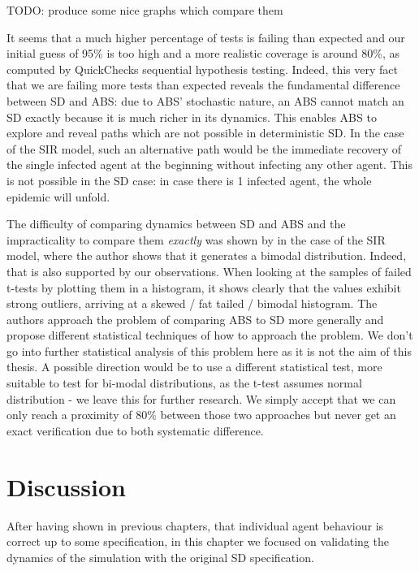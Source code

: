 TODO: produce some nice graphs which compare them 

It seems that a much higher percentage of tests is failing than expected and our initial guess of 95\% is too high and a more realistic coverage is around 80\%, as computed by QuickChecks sequential hypothesis testing. Indeed, this very fact that we are failing more tests than expected reveals the fundamental difference between SD and ABS: due to ABS' stochastic nature, an ABS cannot match an SD exactly because it is much richer in its dynamics. This enables ABS to explore and reveal paths which are not possible in deterministic SD. In the case of the SIR model, such an alternative path would be the immediate recovery of the single infected agent at the beginning without infecting any other agent. This is not possible in the SD case: in case there is 1 infected agent, the whole epidemic will unfold.

The difficulty of comparing dynamics between SD and ABS and the impracticality to compare them \textit{exactly} was shown by \cite{macal_agent-based_2010} in the case of the SIR model, where the author shows that it generates a bimodal distribution. Indeed, that is also supported by our observations. When looking at the samples of failed t-tests by plotting them in a histogram, it shows clearly that the values exhibit strong outliers, arriving at a skewed / fat tailed / bimodal histogram. %
The authors \cite{figueredo_comparing_2014} approach the problem of comparing ABS to SD more generally and propose different statistical techniques of how to approach the problem.
We don't go into further statistical analysis of this problem here as it is not the aim of this thesis. A possible direction would be to use a different statistical test, more suitable to test for bi-modal distributions, as the t-test assumes normal distribution - we leave this for further research. We simply accept that we can only reach a proximity of 80\% between those two approaches but never get an exact verification due to both systematic difference.

\section{Discussion}
After having shown in previous chapters, that individual agent behaviour is correct up to some specification, in this chapter we focused on validating the dynamics of the simulation with the original SD specification.

